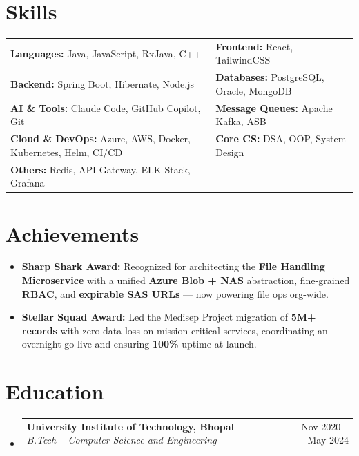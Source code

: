 \documentclass[letterpaper,12pt]{article}
\makeatletter
\newcommand{\resumeItem}[1]{
  \item\small{{\small #1 \vspace{-2pt}}}
}
\newcommand{\resumeSubheading}[4]{
  \vspace{-1pt}\item
    \begin{tabular*}{0.97\textwidth}[t]{l@{\extracolsep{\fill}}r}
      \textbf{#1} \textit{\small{--- #3}} & #2 \\
    \end{tabular*}\vspace{-7pt}
}
\newcommand{\resumeSubItem}[1]{\resumeItem{#1}\vspace{-2pt}}
\newcommand{\resumeSubHeadingListStart}{\begin{itemize}[leftmargin=0.15in, label={}]}
\newcommand{\resumeSubHeadingListEnd}{\end{itemize}}
\makeatother
\begin{document}
\section{Skills}
\begin{itemize}[leftmargin=0.15in, label={}]
  \small{\item{
    \begin{tabular}{@{}l@{\hskip 0.4in}l@{}}
      \textbf{Languages:} Java, JavaScript, RxJava, C++                            & \textbf{Frontend:} React, TailwindCSS \\
      \textbf{Backend:} Spring Boot, Hibernate, Node.js       & \textbf{Databases:} PostgreSQL, Oracle, MongoDB \\
      \textbf{AI \& Tools:} Claude Code, GitHub Copilot, Git            & \textbf{Message Queues:} Apache Kafka, ASB \\
       \textbf{Cloud \& DevOps:} Azure, AWS, Docker, Kubernetes, Helm, CI/CD   &
        \textbf{Core CS:} DSA, OOP, System Design \\
       \textbf{Others:} Redis, API Gateway, ELK Stack, Grafana   & \\
    \end{tabular}
  }}
\end{itemize}
\section{Achievements}
  \resumeSubHeadingListStart
    \resumeSubItem{\textbf{Sharp Shark Award:} Recognized for architecting the \textbf{File Handling Microservice} with a unified \textbf{Azure Blob + NAS} abstraction, fine-grained \textbf{RBAC}, and \textbf{expirable SAS URLs} --- now powering file ops org-wide.}
    \vspace{3pt}
    \resumeSubItem{\textbf{Stellar Squad Award:} Led the Medisep Project migration of \textbf{5M+ records} with zero data loss on mission-critical services, coordinating an overnight go-live and ensuring \textbf{100\%} uptime at launch.}
  \resumeSubHeadingListEnd
\section{Education}
  \resumeSubHeadingListStart
    \resumeSubheading
      {University Institute of Technology, Bhopal}{Nov 2020 -- May 2024}
      {B.Tech -- Computer Science and Engineering}{CGPA: 8.3}
  \resumeSubHeadingListEnd
\end{document}
